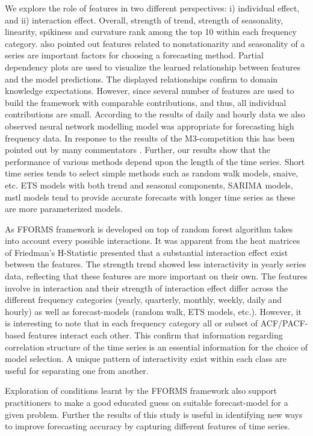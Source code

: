 \documentclass[11pt,a4paper,]{article}
\begin{document}
We explore the role of features in two different perspectives: i)
individual effect, and ii) interaction effect. Overall, strength of
trend, strength of seasonality, linearity, spikiness and curvature rank
among the top 10 within each frequency category.
\textcite{lemke2010meta} also pointed out features related to
nonstationarity and seasonality of a series are important factors for
choosing a forecasting method. Partial dependency plots are used to
visualize the learned relationship between features and the model
predictions. The displayed relationships confirm to domain knowledge
expectations. However, since several number of features are used to
build the framework with comparable contributions, and thus, all
individual contributions are small. According to the results of daily
and hourly data we also observed neural network modelling model was
appropriate for forecasting high frequency data. In response to the
results of the M3-competition this has been pointed out by many
commentators \autocite{makridakis2000m3}. Further, our results show that
the performance of various methods depend upon the length of the time
series. Short time series tends to select simple methods such as random
walk models, snaive, etc. ETS models with both trend and seasonal
components, SARIMA models, mstl models tend to provide accurate
forecasts with longer time series as these are more parameterized
models.

As FFORMS framework is developed on top of random forest algorithm takes
into account every possible interactions. It was apparent from the heat
matrices of Friedman's H-Statistic presented that a substantial
interaction effect exist between the features. The strength trend showed
less interactivity in yearly series data, reflecting that these features
are more important on their own. The features involve in interaction and
their strength of interaction effect differ across the different
frequency categories (yearly, quarterly, monthly, weekly, daily and
hourly) as well as forecast-models (random walk, ETS models, etc.).
However, it is interesting to note that in each frequency category all
or subset of ACF/PACF-based features interact each other. This confirm
that information regarding correlation structure of the time series is
an essential information for the choice of model selection. A unique
pattern of interactivity exist within each class are useful for
separating one from another.

Exploration of conditions learnt by the FFORMS framework also support
practitioners to make a good educated guess on suitable forecast-model
for a given problem. Further the results of this study is useful in
identifying new ways to improve forecasting accuracy by capturing
different features of time series.

\printbibliography[title=References]
\end{document}
